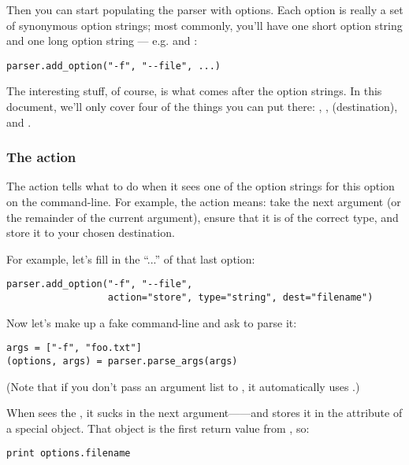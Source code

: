 Then you can start populating the parser with options.  Each option is
really a set of synonymous option strings; most commonly, you'll have
one short option string and one long option string ---
e.g.  and :

\begin{verbatim}
parser.add_option("-f", "--file", ...)
\end{verbatim}

The interesting stuff, of course, is what comes after the option
strings.  In this document, we'll only cover four of the things you
can put there: , ,  (destination), and
.

\subsubsection{The  action\label{optparse-store-action}}

The action tells  what to do when it sees one of the
option strings for this option on the command-line.  For example, the
action  means: take the next argument (or the remainder of
the current argument), ensure that it is of the correct type, and
store it to your chosen destination.

For example, let's fill in the ``...'' of that last option:

\begin{verbatim}
parser.add_option("-f", "--file",
                  action="store", type="string", dest="filename")
\end{verbatim}

Now let's make up a fake command-line and ask  to
parse it:

\begin{verbatim}
args = ["-f", "foo.txt"]
(options, args) = parser.parse_args(args)
\end{verbatim}

(Note that if you don't pass an argument list to
, it automatically uses .)

When  sees the , it sucks in the next
argument------and stores it in the 
attribute of a special object.  That object is the first return value
from , so:

\begin{verbatim}
print options.filename
\end{verbatim}

